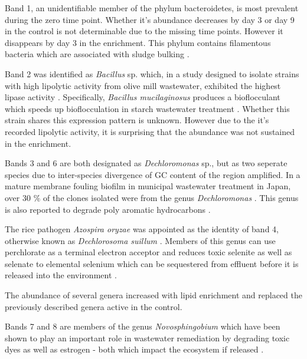 \documentclass[11pt]{article}
\begin{document}
Band 1, an unidentifiable member of the phylum bacteroidetes, is most prevalent during the zero time point. Whether it's abundance decreases by day 3 or day 9 in the control is not determinable due to the missing time points. However it disappears by day 3 in the enrichment. This phylum contains filamentous bacteria  which are associated with sludge bulking \cite{ragelund2008identity}.

Band 2 was identified as \emph{Bacillus} sp. which, in a study designed to isolate strains with high lipolytic activity from olive mill wastewater, exhibited the highest lipase activity \cite{ertuugrul2007isolation}. Specifically, \emph{Bacillus mucilaginosus} produces a bioflocculant which speeds up bioflocculation in starch wastewater treatment \cite{deng2003characteristics}. Whether this strain shares this expression pattern is unknown. However due to the it's recorded lipolytic activity, it is surprising that the abundance was not sustained in the enrichment.

Bands 3 and 6 are both designated as \emph{Dechloromonas} sp., but as two seperate species due to inter-species divergence of GC content of the region amplified. In a mature membrane fouling biofilm in municipal wastewater treatment in Japan, over 30 \% of the clones isolated were from the genus \emph{Dechloromonas} \cite{miura2007membrane}. This genus is also reported to degrade poly aromatic hydrocarbons \cite{oshiki2008pha}.

The rice pathogen \emph{Azospira oryzae} was appointed as the identity of band 4, otherwise known as \emph{Dechlorosoma suillum} \cite{tan2003dechlorosoma}. Members of this genus can use perchlorate as a terminal electron acceptor and reduces toxic selenite as well as selenate to elemental selenium which can be sequestered from effluent before it is released into the environment \cite{reinhold2000reassessment,hunter2007azospira,wilhelmus2013microbiological}.

\vspace{.5cm}
The abundance of several genera increased with lipid enrichment and replaced the previously described genera active in the control.

Bands 7 and 8 are members of the genus \emph{Novosphingobium} which have been shown to play an important role in wastewater remediation by degrading toxic dyes as well as estrogen - both which impact the ecosystem if released \cite{addison2007novosphingobium,hashimoto2009contribution}.
\end{document}
